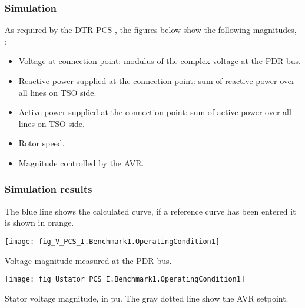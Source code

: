     \subsubsection{Simulation}
    As required by the DTR PCS \DTRPcs, the figures below show the following magnitudes,
    :
    \begin{itemize}
        \item Voltage at connection point: modulus of the complex voltage at
        the PDR bus.
        \item Reactive power supplied at the connection point: sum of reactive power
        over all lines on TSO side.
        \item Active power supplied at the connection point: sum of active power
        over all lines on TSO side.
        \item Rotor speed.
        \item Magnitude controlled by the AVR.
    \end{itemize}

    \subsubsection{Simulation results}
    The blue line shows the calculated curve, if a reference curve has been entered it is
    shown in orange.

    \noindent
    \begin{minipage}[t]{0.48\textwidth}
        \centering
        \texttt{[image: fig\_V\_PCS\_I.Benchmark1.OperatingCondition1]}
        \begin{minipage}[t]{0.8\textwidth}
            \small Voltage magnitude measured at the PDR bus.
        \end{minipage}
    \end{minipage}
    \hfill
        \begin{minipage}[t]{0.48\textwidth}
            \centering
            \texttt{[image: fig\_Ustator\_PCS\_I.Benchmark1.OperatingCondition1]}
            \begin{minipage}[t]{0.8\textwidth}
                \small Stator voltage magnitude, in pu. The gray dotted line show
                the AVR setpoint.
            \end{minipage}
        \end{minipage}

    \vspace{0.5cm}

